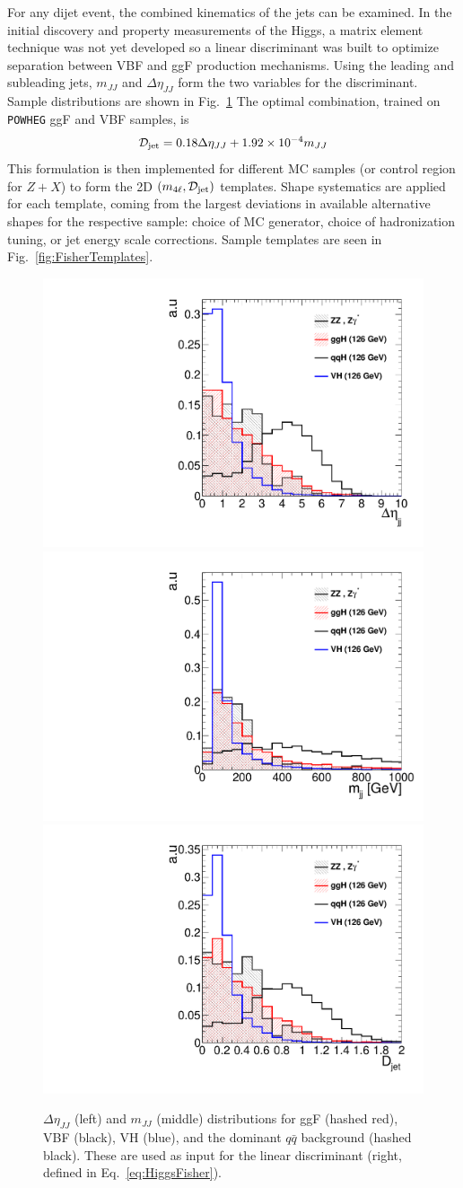 For any dijet event, the combined kinematics of the jets can be examined. In the initial discovery and property measurements of the Higgs, a matrix element technique was not yet developed so a linear discriminant was built to optimize separation between VBF and ggF production mechanisms. Using the leading and subleading jets, $m_{JJ}$ and $\Delta\eta_{JJ}$ form the two variables for the discriminant. Sample distributions are shown in Fig.~\ref{fig:HiggsFisher} The optimal combination, trained on {\tt POWHEG} ggF and VBF samples, is
\begin{equation} \label{eq:HiggsFisher}
\mathcal{D}_{\rm jet} = 0.18\Delta\eta_{JJ} + 1.92\times10^{-4}m_{JJ}
\end{equation}
This formulation is then implemented for different MC samples (or control region for $Z+X$) to form the 2D $(m_{4\ell},\mathcal{D}_{\rm jet})$ templates. Shape systematics are applied for each template, coming from the largest deviations in available alternative shapes for the respective sample: choice of MC generator, choice of hadronization tuning, or jet energy scale corrections. Sample templates are seen in Fig.~\ref{fig:FisherTemplates}.

\begin{figure}[htbp]
\begin{center}
\includegraphics[width=.3\linewidth]{HiggsDiscovery/figures/deta_shape.pdf}
\includegraphics[width=.3\linewidth]{HiggsDiscovery/figures/mjj_shape.pdf}
\includegraphics[width=.3\linewidth]{HiggsDiscovery/figures/djet_shape.pdf} \\
\caption[Jet Kinematic Shapes of Different Higgs Production Mechanisms]{$\Delta\eta_{JJ}$ (left) and $m_{JJ}$ (middle) distributions for ggF (hashed red), VBF (black), VH (blue), and the dominant $q\bar{q}$ background (hashed black). These are used as input for the linear discriminant (right, defined in Eq.~\ref{eq:HiggsFisher}).}
\label{fig:HiggsFisher}
\end{center}
\end{figure}

